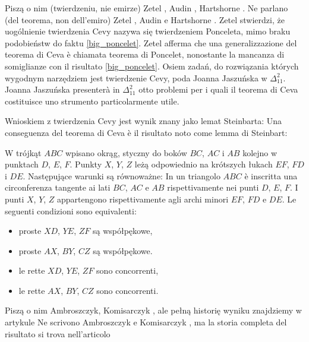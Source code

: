 Piszą o nim (twierdzeniu, nie emirze) Zetel \cite[s. 11-14, 40]{zetel_2020}, Audin \cite[s. 38]{audin_2003}, Hartshorne \cite[s. 182]{hartshorne_2000}. %
Ne parlano (del teorema, non dell'emiro) Zetel \cite[p. 11-14, 40]{zetel_2020}, Audin \cite[p. 38]{audin_2003} e Hartshorne \cite[p. 182]{hartshorne_2000}. %
Zetel stwierdzi, że uogólnienie twierdzenia Cevy nazywa się twierdzeniem Ponceleta, mimo braku podobieństw do faktu \ref{big_poncelet}. %
Zetel afferma che una generalizzazione del teorema di Ceva è chiamata teorema di Poncelet, nonostante la mancanza di somiglianze con il risultato \ref{big_poncelet}. %
Osiem zadań, do rozwiązania których wygodnym narzędziem jest twierdzenie Cevy, poda Joanna Jaszuńska w $\Delta_{11}^2$. %
Joanna Jaszuńska presenterà in $\Delta_{11}^2$ otto problemi per i quali il teorema di Ceva costituisce uno strumento particolarmente utile. %

Wnioskiem z twierdzenia Cevy jest wynik znany jako lemat Steinbarta: %
Una conseguenza del teorema di Ceva è il risultato noto come lemma di Steinbart: %

\begin{lemma}
[Steinbarta]%
[di Steinbart]%
    W trójkąt $ABC$ wpisano okrąg, styczny do boków $BC$, $AC$ i $AB$ kolejno w punktach $D$, $E$, $F$. %
    Punkty $X$, $Y$, $Z$ leżą odpowiednio na krótszych łukach $EF$, $FD$ i $DE$. %
    Następujące warunki są równoważne: %
    In un triangolo $ABC$ è inscritta una circonferenza tangente ai lati $BC$, $AC$ e $AB$ rispettivamente nei punti $D$, $E$, $F$. %
    I punti $X$, $Y$, $Z$ appartengono rispettivamente agli archi minori $EF$, $FD$ e $DE$. %
    Le seguenti condizioni sono equivalenti: %
    \begin{itemize}
        \item proste $XD$, $YE$, $ZF$ są współpękowe, %
        \item proste $AX$, $BY$, $CZ$ są współpękowe. %
        \item le rette $XD$, $YE$, $ZF$ sono concorrenti, %
        \item le rette $AX$, $BY$, $CZ$ sono concorrenti. %
    \end{itemize}
\end{lemma}

Piszą o nim Ambroszczyk, Komisarczyk \cite[s. 17]{komisarczyk_2024}, ale pełną historię wyniku znajdziemy w artykule %
Ne scrivono Ambroszczyk e Komisarczyk \cite[p. 17]{komisarczyk_2024}, ma la storia completa del risultato si trova nell'articolo %

